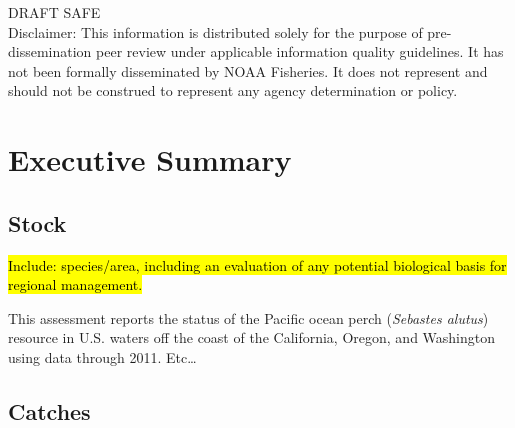 \documentclass[12pt,]{article}
\begin{document}
\begin{center}
\vspace{.3cm}



\vspace{.5cm}

\vfill
DRAFT SAFE\\
Disclaimer: This information is distributed solely for the purpose of pre-dissemination
peer review under applicable information quality guidelines. It has not been formally
disseminated by NOAA Fisheries. It does not represent and should not be construed to
represent any agency determination or policy. 

\vspace{.3cm}

\maketitle

\setcounter{page}{1}
\end{center}

{
\setcounter{tocdepth}{4}
\tableofcontents
}
\setlength{\parskip}{5mm plus1mm minus1mm} \pagebreak

 \setcounter{page}{1}
\renewcommand{\thefigure}{\alph{figure}}
\renewcommand{\thetable}{\alph{table}}

\section*{Executive Summary}\label{executive-summary}

\subsection*{Stock}\label{stock}

\hl{Include: species/area, including an evaluation of any potential biological basis 
for regional management.}

This assessment reports the status of the Pacific ocean perch
(\emph{Sebastes alutus}) resource in U.S. waters off the coast of the
California, Oregon, and Washington using data through 2011. Etc\ldots{}

\subsection*{Catches}\label{catches}
\end{document}
